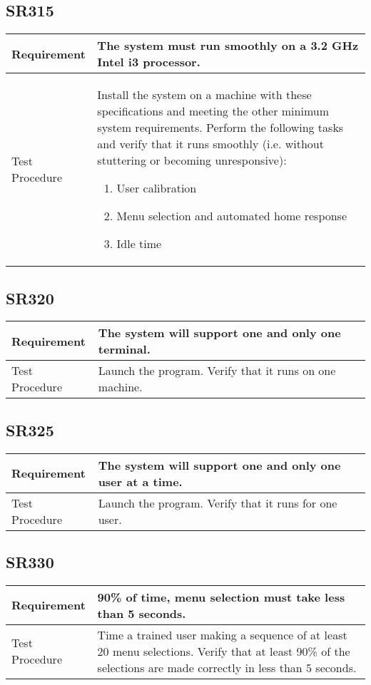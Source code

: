 \documentclass{article}
\begin{document}
\subsection{SR315}
\begin{tabular}{| l | p{12cm}  |}
    \hline
	Requirement & The system must run smoothly on a 3.2 GHz Intel i3 processor. \\ \hline
	Test Procedure & Install the system on a machine with these specifications
	and meeting the other minimum system requirements. Perform the following
	tasks and verify that it runs smoothly (i.e. without stuttering or
	becoming unresponsive):
	\begin{enumerate}
	    \item User calibration
	    \item Menu selection and automated home response
	    \item Idle time
	\end{enumerate}
	\\ \hline
\end{tabular}
\subsection{SR320}
\begin{tabular}{| l | p{12cm}  |}
    \hline
	Requirement & The system will support one and only one terminal. \\ \hline
	Test Procedure & Launch the program. Verify that it runs on one machine. \\ \hline
\end{tabular}
\subsection{SR325}
\begin{tabular}{| l | p{12cm}  |}
    \hline
	Requirement & The system will support one and only one user at a time. \\ \hline
	Test Procedure & Launch the program. Verify that it runs for one user. \\ \hline
\end{tabular}
\subsection{SR330}
\begin{tabular}{| l | p{12cm}  |}
    \hline
	Requirement & 90\% of time, menu selection must take less than 5 seconds. \\ \hline
	Test Procedure & Time a trained user making a sequence of at least 20 menu selections. Verify that at least 90\% of the selections are made correctly in less than 5 seconds. \\ \hline
\end{tabular}
\end{document}
